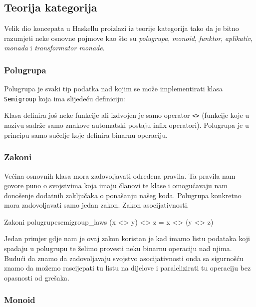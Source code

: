 \subsection{Teorija kategorija}

Velik dio koncepata u Haskellu proizlazi iz teorije kategorija  tako da je bitno razumjeti neke osnovne pojmove kao što su \textit{polugrupa}, \textit{monoid}, \textit{funktor}, \textit{aplikativ}, \textit{monada} i \textit{transformator monade}.

\subsubsection{Polugrupa}

Polugrupa je svaki tip podatka nad kojim se može implementirati klasa \texttt{Semigroup} koja ima slijedeću definiciju:


Klasa definira još neke funkcije ali izdvojen je samo operator \texttt{<>} (funkcije koje u nazivu sadrže samo znakove automatski postaju infix operatori). Polugrupa je u principu samo sučelje koje definira binarnu operaciju.

\subsubsection*{Zakoni}

Većina osnovnih klasa mora zadovoljavati određena pravila. Ta pravila nam govore puno o svojstvima koja imaju članovi te klase i omogućavaju nam donošenje dodatnih zaključaka o ponašanju našeg koda. Polugrupa konkretno mora zadovoljavati samo jedan zakon. Zakon asocijativnosti.

\begin{code}{Zakoni polugrupe}{semigroup_laws}
    (x <> y) <> z = x <> (y <> z)
\end{code}

Jedan primjer gdje nam je ovaj zakon koristan je kad imamo listu podataka koji spadaju u polugrupu te želimo provesti neku binarnu operaciju nad njima. Budući da znamo da zadovoljavaju svojstvo asocijativnosti onda sa sigurnošću znamo da možemo rascijepati tu listu na dijelove i paralelizirati tu operaciju bez opasnosti od grešaka.

\subsubsection{Monoid}

